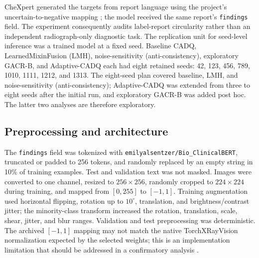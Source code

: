 \documentclass[a4paper,fleqn]{cas-sc}
\begin{document}
CheXpert generated the targets from report language using the project's
uncertain-to-negative mapping \cite{irvin2019chexpert}; the model received the
same report's \texttt{findings} field. The experiment consequently audits
label-report circularity rather than an independent radiograph-only diagnostic
task. The replication unit for seed-level inference was a trained model at a
fixed seed. Baseline CADQ, LearnedMixinFusion (LMH), noise-sensitivity
(anti-consistency), exploratory GACR-B, and Adaptive-CADQ each had eight
retained seeds: 42, 123, 456, 789, 1010, 1111, 1212, and 1313. The eight-seed
plan covered baseline, LMH, and noise-sensitivity (anti-consistency);
Adaptive-CADQ was extended from three to eight seeds after the initial run, and
exploratory GACR-B was added post hoc. The latter two analyses are
therefore exploratory.

\subsection{Preprocessing and architecture}\label{sec:architecture}

The \texttt{findings} field was tokenized with
\texttt{emilyalsentzer/Bio\_ClinicalBERT}, truncated or padded to 256 tokens,
and randomly replaced by an empty string in 10\% of training examples. Test and
validation text was not masked. Images were converted to one channel, resized
to $256\times256$, randomly cropped to $224\times224$ during training, and
mapped from $[0,255]$ to $[-1,1]$. Training augmentation used horizontal
flipping, rotation up to $10^{\circ}$, translation, and brightness/contrast
jitter; the minority-class transform increased the rotation, translation,
scale, shear, jitter, and blur ranges. Validation and test preprocessing was
deterministic. The archived $[-1,1]$ mapping may not match the native
TorchXRayVision normalization expected by the selected weights; this is an
implementation limitation that should be addressed in a confirmatory analysis
\cite{cohen2022torchxrayvision}.
\end{document}
